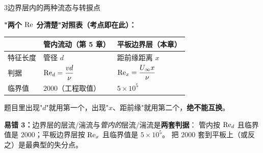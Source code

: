 \begin{kaodian}{3}{边界层内的两种流态与转捩点}
\begin{banfa}
\textbf{"两个 $\mathrm{Re}$ 分清楚"对照表（考点即在此）：}
\begin{center}
\begin{tabularx}{\textwidth}{@{}lXX@{}}
\toprule
 & 管内流动（第 5 章） & 平板边界层（本章） \\
\midrule
特征长度 & 管径 $d$ & 距前缘距离 $x$ \\
判据 & $\mathrm{Re}_d=\dfrac{vd}{\nu}$ & $\mathrm{Re}_x=\dfrac{U_\infty x}{\nu}$ \\
临界值 & $2000$（工程取值） & $5\times10^5$ \\
\bottomrule
\end{tabularx}
\end{center}
题目里出现"$d$"就用第一个，出现"$x$、距前缘"就用第二个，\textbf{绝不能互换}。
\end{banfa}

\begin{yicuo}
\textbf{易错 3：}边界层的层流/湍流与\emph{管内的}层流/湍流是\textbf{两套判据}：
管内按 $\mathrm{Re}_d$ 且临界值是 $2000$；平板边界层按 $\mathrm{Re}_x$ 且临界值是 $5\times10^5$。
把 $2000$ 套到平板上（或反之）是最典型的失分点。
\end{yicuo}
\end{kaodian}

